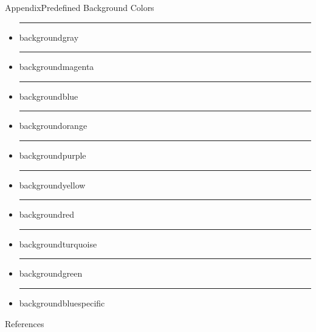 \documentclass{beamer}
\begin{document}
\begin{frame}{Appendix}{Predefined Background Colors}
	\begin{itemize}
		\item {\color{backgroundgray}\rule{.7cm}{.4cm}} backgroundgray
		\item {\color{backgroundmagenta}\rule{.7cm}{.4cm}} backgroundmagenta
		\item {\color{backgroundblue}\rule{.7cm}{.4cm}} backgroundblue
		\item {\color{backgroundorange}\rule{.7cm}{.4cm}} backgroundorange
		\item {\color{backgroundpurple}\rule{.7cm}{.4cm}} backgroundpurple
		\item {\color{backgroundyellow}\rule{.7cm}{.4cm}} backgroundyellow
		\item {\color{backgroundred}\rule{.7cm}{.4cm}} backgroundred
		\item {\color{backgroundturquoise}\rule{.7cm}{.4cm}} backgroundturquoise
		\item {\color{backgroundgreen}\rule{.7cm}{.4cm}} backgroundgreen
		\item {\color{backgroundbluespecific}\rule{.7cm}{.4cm}} backgroundbluespecific
	\end{itemize}
\end{frame}

\begin{frame}[t,allowframebreaks]{References}
	\scriptsize
	\nocite{*}
	
	
\end{frame}
\end{document}
